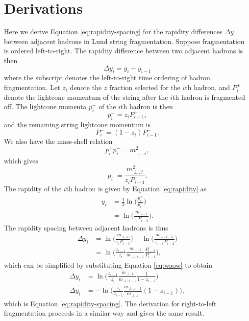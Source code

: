 \documentclass[12pt,a4paper]{report}
\begin{document}
\appendix
\chapter{Derivations}
\label{app:rapidity-spacing}
Here we derive Equation \eqref{eq:rapidity-spacing} for the rapidity differences $\Delta y$ between adjacent hadrons in Lund string fragmentation. Suppose fragmentation is ordered left-to-right. The rapidity difference between two adjacent hadrons is then
\begin{equation}
  \Delta y_i = y_i - y_{i - 1}
\end{equation}
where the subscript denotes the left-to-right time ordering of hadron fragmentation. Let $z_i$ denote the $z$ fraction selected for the $i$th hadron, and $P_i^\pm$ denote the lightcone momentum of the string after the $i$th hadron is fragmented off. The lightcone momenta $p^-_i$ of the $i$th hadron is then
\begin{equation}
  p^-_i = z_i P_{i - 1}^-,
\end{equation}
and the remaining string lightcone momentum is
\begin{equation}\label{eq:waow}
  P_i^- = (1 - z_i) P_{i-1}^-.
\end{equation}
We also have the mass-shell relation
\begin{equation}
  p^+_i p^-_i = m_{\perp,i}^2,
\end{equation}
which gives
\begin{equation}
  p^+_i = \frac{m_{\perp,i}^2}{z_i P_{i-1}^-}.
\end{equation}
The rapidity of the $i$th hadron is given by Equation \eqref{eq:rapidity} as
\begin{align}
  y_i &= \frac{1}{2} \ln \Bigr( \frac{p_i^+}{p_i^-} \Bigr) \nonumber \\
      &= \ln \Bigr( \frac{m_{\perp,i}}{z_i P_{i-1}^-} \Bigr).
\end{align}
The rapidity spacing between adjacent hadrons is thus
\begin{align}
  \Delta y_i &= \ln \Bigr( \frac{m_{\perp,i}}{z_i P_{i-1}^-} \Bigr) - \ln \Bigr( \frac{m_{\perp,i-1}}{z_{i-1} P_{i-2}^-} \Bigr) \nonumber \\
  &= \ln \Bigr( \frac{z_{i-1}}{z_i} \frac{m_{\perp,i}}{m_{\perp,i-1}} \frac{P^-_{i-2}}{P^-_{i-1}} \Bigr),
\end{align}
which can be simplified by substituting Equation \eqref{eq:waow} to obtain
\begin{align}
  \Delta y_i &= \ln \Bigr( \frac{z_{i-1}}{z_i} \frac{m_{\perp,i}}{m_{\perp,i-1}} \frac{1}{1 - z_{i - 1}} \Bigr) \nonumber \\
  \Delta y_i &= -\ln \Bigr( \frac{z_i}{z_{i-1}} \frac{m_{\perp,i-1}}{m_{\perp,i}} (1 - z_{i-1}) \Bigr),
\end{align}
which is Equation \eqref{eq:rapidity-spacing}. The derivation for right-to-left fragmentation proceeds in a similar way and gives the same result.



\end{document}

